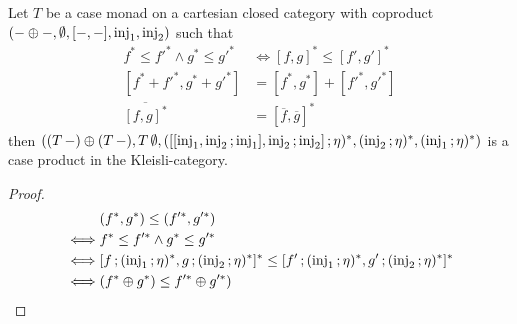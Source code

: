 \documentclass[runningheads,envcountsame]{llncs}
\begin{document}
\begin{lemma}
    Let $T$ be a case monad on a cartesian closed category with coproduct $(- \oplus -, \emptyset, [-, -], \inj_1, \inj_2)$ such that
    \begin{align}
        f^* \leq f'^* \wedge g^* \leq g'^* &\iff [f, g]^* \leq [f', g']^* \\
        [f^* + f'^*, g^* + g'^*] &= [f^*, g^*] + [f'^*, g'^*] \\
        \overline{[f, g]^*} &= [\overline{f}, \overline{g}]^*
    \end{align}
    then $((T\,-) \oplus (T\,-), T\,\emptyset, (\comp{[[\inj_1, \comp{\inj_2}{\inj_1}], \comp{\inj_2}{\inj_2}]}{\munit})^*, (\comp{\inj_2}{\munit})^*, (\comp{\inj_1}{\munit})^*)$ is a case product in the Kleisli-category.
\end{lemma}
\begin{proof}
    \begin{align}
        &(f^*, g^*) \leq (f'^*, g'^*) \\
        \iff & f^* \leq f'^* \wedge g^* \leq g'^* \\
        \iff & [\comp{f}{(\comp{\inj_1}{\munit})^*}, \comp{g}{(\comp{\inj_2}{\munit})^*}]^* \leq [\comp{f'}{(\comp{\inj_1}{\munit})^*}, \comp{g'}{(\comp{\inj_2}{\munit})^*}]^* \\
        \iff & (f^* \oplus g^*) \leq f'^* \oplus g'^*)
    \end{align}
\end{proof}
\end{document}
